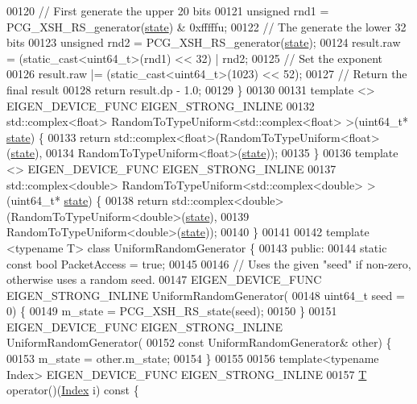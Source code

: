 \begin{DoxyCode}
00120   \textcolor{comment}{// First generate the upper 20 bits}
00121   \textcolor{keywordtype}{unsigned} rnd1 = PCG\_XSH\_RS\_generator(\hyperlink{structstate}{state}) & 0xfffffu;
00122   \textcolor{comment}{// The generate the lower 32 bits}
00123   \textcolor{keywordtype}{unsigned} rnd2 = PCG\_XSH\_RS\_generator(\hyperlink{structstate}{state});
00124   result.raw = (\textcolor{keyword}{static\_cast<}uint64\_t\textcolor{keyword}{>}(rnd1) << 32) | rnd2;
00125   \textcolor{comment}{// Set the exponent}
00126   result.raw |= (\textcolor{keyword}{static\_cast<}uint64\_t\textcolor{keyword}{>}(1023) << 52);
00127   \textcolor{comment}{// Return the final result}
00128   \textcolor{keywordflow}{return} result.dp - 1.0;
00129 \}
00130 
00131 \textcolor{keyword}{template} <> EIGEN\_DEVICE\_FUNC EIGEN\_STRONG\_INLINE
00132 std::complex<float> RandomToTypeUniform<std::complex<float> >(uint64\_t* \hyperlink{structstate}{state}) \{
00133   \textcolor{keywordflow}{return} std::complex<float>(RandomToTypeUniform<float>(\hyperlink{structstate}{state}),
00134                              RandomToTypeUniform<float>(\hyperlink{structstate}{state}));
00135 \}
00136 \textcolor{keyword}{template} <> EIGEN\_DEVICE\_FUNC EIGEN\_STRONG\_INLINE
00137 std::complex<double> RandomToTypeUniform<std::complex<double> >(uint64\_t* \hyperlink{structstate}{state}) \{
00138   \textcolor{keywordflow}{return} std::complex<double>(RandomToTypeUniform<double>(\hyperlink{structstate}{state}),
00139                               RandomToTypeUniform<double>(\hyperlink{structstate}{state}));
00140 \}
00141 
00142 \textcolor{keyword}{template} <\textcolor{keyword}{typename} T> \textcolor{keyword}{class }UniformRandomGenerator \{
00143  \textcolor{keyword}{public}:
00144   \textcolor{keyword}{static} \textcolor{keyword}{const} \textcolor{keywordtype}{bool} PacketAccess = \textcolor{keyword}{true};
00145 
00146   \textcolor{comment}{// Uses the given "seed" if non-zero, otherwise uses a random seed.}
00147   EIGEN\_DEVICE\_FUNC EIGEN\_STRONG\_INLINE UniformRandomGenerator(
00148       uint64\_t seed = 0) \{
00149     m\_state = PCG\_XSH\_RS\_state(seed);
00150   \}
00151   EIGEN\_DEVICE\_FUNC EIGEN\_STRONG\_INLINE UniformRandomGenerator(
00152       \textcolor{keyword}{const} UniformRandomGenerator& other) \{
00153     m\_state = other.m\_state;
00154   \}
00155 
00156   \textcolor{keyword}{template}<\textcolor{keyword}{typename} Index> EIGEN\_DEVICE\_FUNC EIGEN\_STRONG\_INLINE
00157   \hyperlink{group___sparse_core___module_class_eigen_1_1_triplet}{T} operator()(\hyperlink{namespace_eigen_a62e77e0933482dafde8fe197d9a2cfde}{Index} i)\textcolor{keyword}{ const }\{

\end{DoxyCode}
